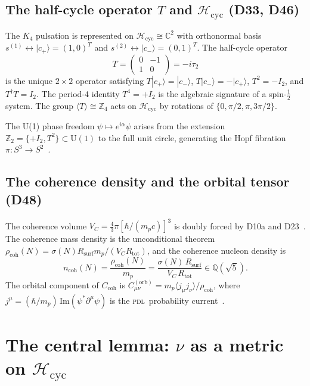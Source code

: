 \documentclass[12pt,a4paper]{article}
\newcommand{\Kfour}{K_4}
\newcommand{\hb}{\hbar}
\newcommand{\PDL}{\textsc{pdl}}
\newcommand{\Ccoh}{C_{\mathrm{coh}}}
\newcommand{\Corb}{C^{(\mathrm{orb})}}
\newcommand{\rhocoh}{\rho_{\mathrm{coh}}}
\newcommand{\Hcyc}{\mathcal{H}_{\mathrm{cyc}}}
\newcommand{\cplu}{|c_+\rangle}
\newcommand{\cmin}{|c_-\rangle}
\newcommand{\Rsurf}{R_{\mathrm{surf}}}
\newcommand{\Rtot}{R_{\mathrm{tot}}}
\newcommand{\VC}{V_C}
\newcommand{\sig}{\sigma}
\newcommand{\ncoh}{n_{\mathrm{coh}}}
\begin{document}
\subsection{The half-cycle operator \texorpdfstring{$T$}{T} and \texorpdfstring{$\Hcyc$}{Hcyc} (D33, D46)}

The $\Kfour$ pulsation is represented on $\Hcyc \cong \mathbb{C}^2$ with orthonormal basis $s^{(1)} \leftrightarrow \cplu = (1,0)^T$ and $s^{(2)} \leftrightarrow \cmin = (0,1)^T$. The half-cycle operator~\cite{PDL_D33_2026}
\begin{equation}
T = \begin{pmatrix}0 & -1 \\ 1 & 0\end{pmatrix} = -i\tau_2
\label{eq:T}
\end{equation}
is the unique $2\times 2$ operator satisfying $T\cplu = \cmin$, $T\cmin = -\cplu$, $T^2 = -I_2$, and $T^\dagger T = I_2$. The period-4 identity $T^4 = +I_2$ is the algebraic signature of a spin-$\tfrac{1}{2}$ system. The group $\langle T \rangle \cong \mathbb{Z}_4$ acts on $\Hcyc$ by rotations of $\{0, \pi/2, \pi, 3\pi/2\}$.

The U(1) phase freedom $\psi \mapsto e^{i\alpha}\psi$ arises from the extension $\mathbb{Z}_2 = \{+I_2, T^2\} \subset \mathrm{U}(1)$ to the full unit circle, generating the Hopf fibration $\pi: S^3 \to S^2$~\cite{PDL_D46_2026}.

\subsection{The coherence density and the orbital tensor (D48)}

The coherence volume $\VC = \tfrac{4}{3}\pi[\hb/(m_p c)]^3$ is doubly forced by D10a and D23~\cite{PDL_D48_2026}. The coherence mass density is the unconditional theorem $\rhocoh(N) = \sig(N)\Rsurf m_p/(\VC\Rtot)$, and the coherence nucleon density is
\begin{equation}
\ncoh(N) = \frac{\rhocoh(N)}{m_p} = \frac{\sig(N)\,\Rsurf}{\VC\,\Rtot} \in \mathbb{Q}(\sqrt{5}).
\label{eq:ncoh}
\end{equation}
The orbital component of $\Ccoh$ is $\Corb_{\mu\nu} = m_p\langle j_\mu j_\nu\rangle/\rhocoh$, where $j^\mu = (\hb/m_p)\,\mathrm{Im}(\psi^*\partial^\mu\psi)$ is the \PDL\ probability current~\cite{PDL_D32_2026,PDL_D48_2026}.

\section{The central lemma: \texorpdfstring{$\nu$}{nu} as a metric on \texorpdfstring{$\Hcyc$}{Hcyc}}
\label{sec:nu_Hcyc}
\end{document}
